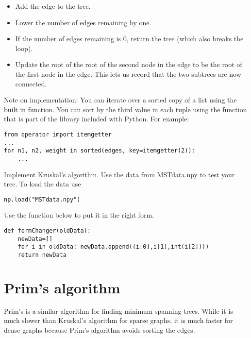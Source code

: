 \begin{itemize}
\begin{itemize}
		\begin{itemize}

		\item Add the edge to the tree.

		\item Lower the number of edges remaining by one.

		\item If the number of edges remaining is 0, return the tree (which also breaks the loop).

		\item Update the root of the root of the second node in the edge to be the root of the first node in the edge.
			This lets us record that the two subtrees are now connected.

		\end{itemize}

	\end{itemize}

\end{itemize}
Note on implementation: You can iterate over a sorted copy of a list using the built in  function.
You can sort by the third value in each tuple using the  function that is part of the  library included with Python.
For example:
\begin{lstlisting}
from operator import itemgetter
...
for n1, n2, weight in sorted(edges, key=itemgetter(2)):
    ...
\end{lstlisting}

\begin{problem}
Implement Kruskal's algorithm.
Use the data from MSTdata.npy to test your tree. To load the data use
\begin{lstlisting}
np.load("MSTdata.npy")
\end{lstlisting}
Use the  function below to put it in the right form.
\begin{lstlisting}
def formChanger(oldData):
    newData=[]
    for i in oldData: newData.append((i[0],i[1],int(i[2])))
    return newData
\end{lstlisting}
\end{problem}
\section*{Prim's algorithm}

Prim's is a similar algorithm for finding minimum spanning trees.
While it is much slower than Kruskal's algorithm for sparse graphs, it is much faster for dense graphs because Prim's algorithm avoids sorting the edges.

